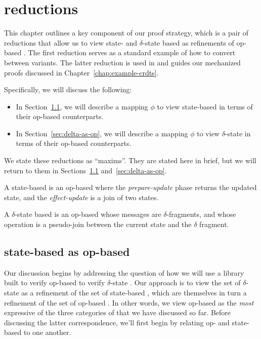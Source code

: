 \chapter{\CRDT reductions}
\label{chap:crdt-reductions}

This chapter outlines a key component of our proof strategy, which is a pair of
reductions that allow us to view state- and $\delta$-state based \CRDTs as
refinements of op-based \CRDTs.  The first reduction serves as a standard
example of how to convert between \CRDT variants. The latter reduction is used
in and guides our mechanized proofs discussed in
Chapter~\ref{chap:example-crdts}.

Specifically, we will discuss the following:
\begin{itemize}
  \item In Section~\ref{sec:state-as-op}, we will describe a mapping $\phi$ to
    view state-based \CRDTs in terms of their op-based counterparts.
  \item In Section~\ref{sec:delta-as-op}, we will describe a mapping $\phi$
    to view $\delta$-state \CRDTs in terms of their op-based counterparts.
\end{itemize}

We state these reductions as ``maxims''. They are stated here in brief, but we
will return to them in Sections~\ref{sec:state-as-op} and~\ref{sec:delta-as-op}.

\begin{maxim}
  \label{maxim:state-as-op}
  A state-based \CRDT is an op-based \CRDT where the \emph{prepare-update} phase
  returns the updated state, and the \emph{effect-update} is a join of two
  states.
\end{maxim}

\begin{maxim}
  \label{maxim:delta-as-op}
  A $\delta$-state based \CRDT is an op-based \CRDT whose messages are
  $\delta$-fragments, and whose operation is a pseudo-join between the current
  state and the $\delta$ fragment.
\end{maxim}

\section{state-based \CRDTs as op-based}
\label{sec:state-as-op}
Our discussion begins by addressing the question of how we will use a library
built to verify op-based \CRDTs to verify $\delta$-state \CRDTs. Our approach is
to view the set of $\delta$-state \CRDTs as a refinement of the set of
state-based \CRDTs, which are themselves in turn a refinement of the set of
op-based \CRDTs. In other words, we view op-based \CRDTs as the \emph{most}
expressive of the three categories of \CRDTs that we have discussed so far.
Before discussing the latter correspondence, we'll first begin by relating op-
and state-based \CRDTs to one another.

